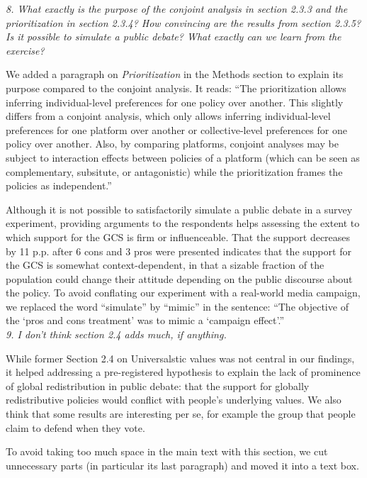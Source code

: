 \documentclass[12pt,english]{article}
\begin{document}
\textit{8. What exactly is the purpose of the conjoint analysis in section 2.3.3 and the prioritization in section 2.3.4? How convincing are the results from section 2.3.5? %
Is it possible to simulate a public debate? What exactly can we learn from the exercise?}

We added a paragraph on \textit{Prioritization} in the Methods section to explain its purpose compared to the conjoint analysis. It reads: ``The prioritization allows inferring individual-level preferences for one policy over another. This slightly differs from a conjoint analysis, which only allows inferring individual-level preferences for one platform over another or collective-level preferences for one policy over another. Also, by comparing platforms, conjoint analyses may be subject to interaction effects between policies of a platform (which can be seen as complementary, subsitute, or antagonistic) while the prioritization frames the policies as independent.''

Although it is not possible to satisfactorily simulate a public debate in a survey experiment, providing arguments to the respondents helps assessing the extent to which support for the GCS is firm or influenceable. That the support decreases by 11 p.p. after 6 cons and 3 pros were presented indicates that the support for the GCS is somewhat context-dependent, in that a sizable fraction of the population could change their attitude depending on the public discourse about the policy. To avoid conflating our experiment with a real-world media campaign, we replaced the word ``simulate'' by ``mimic'' in the sentence: ``The objective of the `pros and cons treatment' was to mimic a `campaign effect'.''
~\\

\textit{9. I don’t think section 2.4 adds much, if anything.}

While former Section 2.4 on Universalstic values was not central in our findings, it helped addressing a pre-registered hypothesis to explain the lack of prominence of global redistribution in public debate: that the support for globally redistributive policies would conflict with people's underlying values. We also think that some results are interesting per se, for example the group that people claim to defend when they vote. 

To avoid taking too much space in the main text with this section, we cut unnecessary parts (in particular its last paragraph) and moved it into a text box.
~\\
\end{document}
